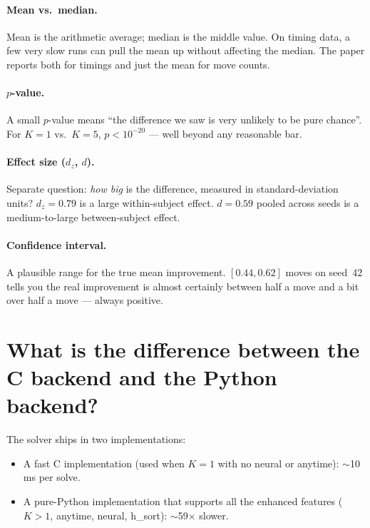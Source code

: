 \documentclass[11pt,a4paper]{article}
\begin{document}
\paragraph{Mean vs.\ median.} Mean is the arithmetic average; median is
the middle value. On timing data, a few very slow runs can pull the
mean up without affecting the median. The paper reports both for
timings and just the mean for move counts.

\paragraph{$p$-value.} A small $p$-value means ``the difference we saw
is very unlikely to be pure chance''. For $K=1$ vs.\ $K=5$, $p <
10^{-20}$ --- well beyond any reasonable bar.

\paragraph{Effect size ($d_z$, $d$).} Separate question: \emph{how big}
is the difference, measured in standard-deviation units? $d_z = 0.79$
is a large within-subject effect. $d = 0.59$ pooled across seeds is a
medium-to-large between-subject effect.

\paragraph{Confidence interval.} A plausible range for the true mean
improvement. $[0.44, 0.62]$ moves on seed~42 tells you the real
improvement is almost certainly between half a move and a bit over half
a move --- always positive.

\section{What is the difference between the C backend and the Python backend?}

The solver ships in two implementations:

\begin{itemize}[leftmargin=2em]
  \item A fast C implementation (used when $K=1$ with no neural or
        anytime): $\sim$10\,ms per solve.
  \item A pure-Python implementation that supports all the enhanced
        features ($K>1$, anytime, neural, h\_sort): $\sim$59$\times$
        slower.
\end{itemize}
\end{document}
